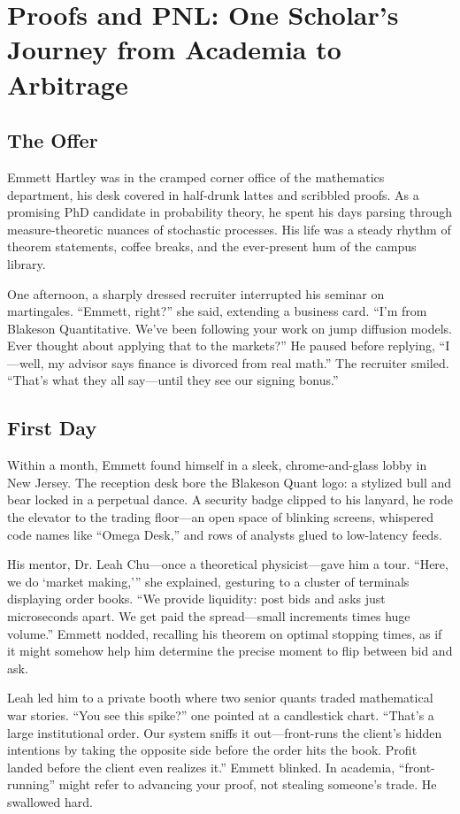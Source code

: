 \section{Proofs and PNL: One Scholar’s Journey from Academia to Arbitrage}

\subsection{The Offer}

Emmett Hartley was in the cramped corner office of the mathematics department, his desk covered in half-drunk 
lattes and scribbled proofs. As a promising PhD candidate in probability theory, he spent his days parsing 
through measure-theoretic nuances of stochastic processes. His life was a steady rhythm of theorem statements, 
coffee breaks, and the ever-present hum of the campus library.

One afternoon, a sharply dressed recruiter interrupted his seminar on martingales. “Emmett, right?” she said, 
extending a business card. “I’m from Blakeson Quantitative. We’ve been following your work on jump diffusion 
models. Ever thought about applying that to the markets?” He paused before replying, “I—well, my advisor says 
finance is divorced from real math.” The recruiter smiled. “That’s what they all say—until they see our signing 
bonus.”

\subsection{First Day}

Within a month, Emmett found himself in a sleek, chrome-and-glass lobby in New Jersey. The reception desk 
bore the Blakeson Quant logo: a stylized bull and bear locked in a perpetual dance. A security badge clipped 
to his lanyard, he rode the elevator to the trading floor—an open space of blinking screens, whispered code 
names like “Omega Desk,” and rows of analysts glued to low-latency feeds.

His mentor, Dr. Leah Chu—once a theoretical physicist—gave him a tour. “Here, we do ‘market making,’” she 
explained, gesturing to a cluster of terminals displaying order books. “We provide liquidity: post bids 
and asks just microseconds apart. We get paid the spread—small increments times huge volume.” Emmett nodded, 
recalling his theorem on optimal stopping times, as if it might somehow help him determine the precise moment 
to flip between bid and ask.

Leah led him to a private booth where two senior quants traded mathematical war stories. “You see this spike?” 
one pointed at a candlestick chart. “That’s a large institutional order. Our system sniffs it out—front-runs the 
client’s hidden intentions by taking the opposite side before the order hits the book. Profit landed before the 
client even realizes it.” Emmett blinked. In academia, “front-running” might refer to advancing your proof, not 
stealing someone’s trade. He swallowed hard.

